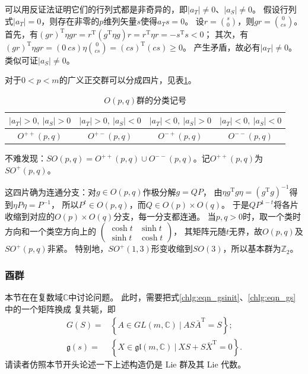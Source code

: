 可以用反证法证明它们的行列式都是非奇异的，即$|a_T| \neq 0$、$|a_S| \neq 0$。
假设行列式$|a_T| = 0$，则存在非零的$p$维列矢量$s$使得$a_T s =0$。
设$r=\binom{s}{0}$，则$gr=\binom{0}{cs}$。
首先，有$(gr)^{\mathrm{T}} \eta gr = r^{\mathrm{T}} (g^{\mathrm{T}} \eta g) r = r^{\mathrm{T}} \eta r = - s^{\mathrm{T}} s <0 $；
其次，有$(gr)^{\mathrm{T}} \eta gr = (0 \  cs) \eta \binom{0}{cs} = (cs)^{\mathrm{T}} (cs)\geqslant 0$。
产生矛盾，故必有$|a_T| \neq 0$。类似可证$|a_S| \neq 0$。

对于$0 < p < m$的广义正交群可以分成四片，见表\ref{chlg:tab-GO}。

\begin{table}[htb]
    \centering
    \caption{$O(p,q)$群的分类记号} \label{chlg:tab-GO}
    \begin{tabular}{|*{4}{c|}}
        \hline
        $| a_T| >0,\ | a_S |>0$ & $ |a_T| >0,\ | a_S |<0$ & $| a_T| <0,\ | a_S| >0$  & $| a_T| <0,\ | a_S| <0$ \\
        \hline
        $O^{++}(p,q)$ & $O^{+-}(p,q)$ & $O^{-+}(p,q)$ & $O^{--}(p,q)$   \\
        \hline
    \end{tabular}
\end{table}

不难发现：$SO(p,q)= O^{++}(p,q)\cup O^{--}(p,q)$。记$O^{++}(p,q)$为$SO^{+}(p,q)$。

这四片确为连通分支：对$g\in O(p,q)$作极分解$g=QP$，
由$\eta g^{\mathrm T}g\eta=(g^{\mathrm T}g)^{-1}$得到$\eta P\eta=P^{-1}$，
所以$P^t\in O(p,q)$，而$Q\in O(p)\times O(q)$。
于是$QP^{1-t}$将各片收缩到对应的$O(p)\times O(q)$分支，每一分支都连通。
当$p,q>0$时，取一个类时方向和一个类空方向上的
$\left(\begin{smallmatrix}\cosh t&\sinh t\\\sinh t&\cosh t\end{smallmatrix}\right)$，
其矩阵元随$t$无界，故$O(p,q)$及$SO^+(p,q)$非紧。
特别地，$SO^+(1,3)$形变收缩到$SO(3)$，所以基本群为$\mathbb Z_2$。

\subsubsection{酉群}\label{chlg:sec_unitary}

本节在在复数域$\mathbb{C}$中讨论问题。
此时，需要把式\eqref{chlg:eqn_gsinit}、\eqref{chlg:eqn_gs}中的一个矩阵换成
复共轭，即
\begin{align}
    G(S)=& \left\{ A \in GL(m,\mathbb{C})\ |\  A S \bar{A}^{\mathrm{T}} =S \right\};\label{chlg:eqn_gsinit-cx} \\
    \mathfrak{g}(s) =& \left\{ X \in \mathfrak{gl}(m,\mathbb{C}) \ |\
    X S + S \bar{X}^{\mathrm{T}} = 0 \right\} . \label{chlg:eqn_gs-cx}
\end{align}
请读者仿照本节开头论述一下上述构造仍是 Lie 群及其 Lie 代数。

